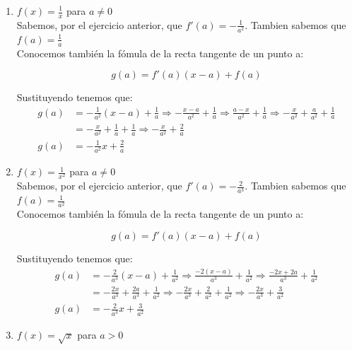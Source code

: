 \documentclass[12pt]{article}
\begin{document}
\begin{enumerate}[\hspace{9px} a)]
    \item \(f(x)=\displaystyle\frac{1}{x}\) para \(a \neq 0\)\\

        Sabemos, por el ejercicio anterior, que \(f'(a)=-\displaystyle\frac{1}{a^2}\). Tambien sabemos que \(f(a)=\displaystyle\frac{1}{a}\)\\

        Conocemos también la fómula de la recta tangente de un punto a:

        \[g(a)=f'(a)(x-a)+f(a)\]

        Sustituyendo tenemos que:
        \begin{align*}
            g(a)&=-\frac{1}{a^2}(x-a)+\frac{1}{a} \Rightarrow -\frac{x-a}{a^2}+\frac{1}{a} \Rightarrow \frac{a-x}{a^2}+\frac{1}{a} \Rightarrow -\frac{x}{a^2}+\frac{a}{a^2}+\frac{1}{a}\\
            &=-\frac{x}{a^2}+\frac{1}{a}+\frac{1}{a} \Rightarrow -\frac{x}{a^2}+\frac{2}{a}\\
            g(a)&=-\frac{1}{a^2}x+\frac{2}{a}
        \end{align*}

    \item \(f(x)=\displaystyle\frac{1}{x^2}\) para \(a \neq 0\)\\

        Sabemos, por el ejercicio anterior, que \(f'(a)=-\displaystyle\frac{2}{a^3}\). Tambien sabemos que \(f(a)=\displaystyle\frac{1}{a^2}\)\\

        Conocemos también la fómula de la recta tangente de un punto a:

        \[g(a)=f'(a)(x-a)+f(a)\]

        Sustituyendo tenemos que:
        \begin{align*}
            g(a)&=-\frac{2}{a^3}(x-a)+\frac{1}{a^2} \Rightarrow \frac{-2(x-a)}{a^3}+\frac{1}{a^2} \Rightarrow \frac{-2x+2a}{a^3}+\frac{1}{a^2}\\
            &=-\frac{2x}{a^3}+\frac{2a}{a^3}+\frac{1}{a^2} \Rightarrow -\frac{2x}{a^3}+\frac{2}{a^2}+\frac{1}{a^2} \Rightarrow -\frac{2x}{a^3}+\frac{3}{a^2}\\
            g(a)&=-\frac{2}{a^3}x+\frac{3}{a^2}
        \end{align*}

    \item \(f(x)=\sqrt{x}\) para \(a > 0\)\\


\end{enumerate}
\end{document}
